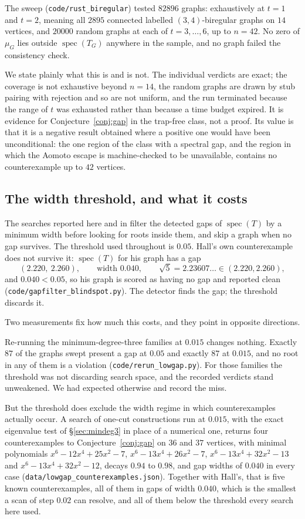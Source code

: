 \documentclass[11pt]{article}
\theoremstyle{remark}
\begin{document}
The sweep (\texttt{code/rust\_biregular}) tested $82896$ graphs: exhaustively at $t=1$ and $t=2$,
meaning all $2895$ connected labelled $(3,4)$-biregular graphs on $14$ vertices, and $20000$ random
graphs at each of $t=3,\dots,6$, up to $n=42$. No zero of $\mu_G$ lies outside
$\operatorname{spec}(T_G)$ anywhere in the sample, and no graph failed the consistency check.

We state plainly what this is and is not. The individual verdicts are exact; the coverage is not
exhaustive beyond $n=14$, the random graphs are drawn by stub pairing with rejection and so are not
uniform, and the run terminated because the range of $t$ was exhausted rather than because a time
budget expired. It is evidence for Conjecture~\ref{conj:gap} in the trap-free class, not a proof.
Its value is that it is a negative result obtained where a positive one would have been
unconditional: the one region of the class with a spectral gap, and the region in which the Aomoto
escape is machine-checked to be unavailable, contains no counterexample up to $42$ vertices.

\subsection{The width threshold, and what it costs}\label{sec:blindspot}

The searches reported here and in \cite{Supp} filter the detected gaps of $\operatorname{spec}(T)$
by a minimum width before looking for roots inside them, and skip a graph when no gap survives. The
threshold used throughout is $0.05$. Hall's own counterexample does not survive it:
$\operatorname{spec}(T)$ for his graph has a gap
\[
  (2.220,\ 2.260),\qquad\text{width }0.040,\qquad \sqrt5=2.23607\ldots\in(2.220,2.260),
\]
and $0.040<0.05$, so his graph is scored as having no gap and reported clean
(\texttt{code/gapfilter\_blindspot.py}). The detector finds the gap; the threshold discards it.

Two measurements fix how much this costs, and they point in opposite directions.

Re-running the minimum-degree-three families at $0.015$ changes nothing. Exactly $87$ of the graphs
swept present a gap at $0.05$ and exactly $87$ at $0.015$, and no root in any of them is a violation
(\texttt{code/rerun\_lowgap.py}). For those families the threshold was not discarding search space,
and the recorded verdicts stand unweakened. We had expected otherwise and record the miss.

But the threshold does exclude the width regime in which counterexamples actually occur. A search of
one-cut constructions run at $0.015$, with the exact eigenvalue test of \S\ref{sec:mindeg3} in place
of a numerical one, returns four counterexamples to Conjecture~\ref{conj:gap} on $36$ and $37$
vertices, with minimal polynomials $x^6-12x^4+25x^2-7$, $x^6-13x^4+26x^2-7$, $x^6-13x^4+32x^2-13$
and $x^6-13x^4+32x^2-12$, decays $0.94$ to $0.98$, and gap widths of $0.040$ in every case
(\texttt{data/lowgap\_counterexamples.json}). Together with Hall's, that is five known
counterexamples, all of them in gaps of width $0.040$, which is the smallest a scan of step $0.02$
can resolve, and all of them below the threshold every search here used.
\end{document}
